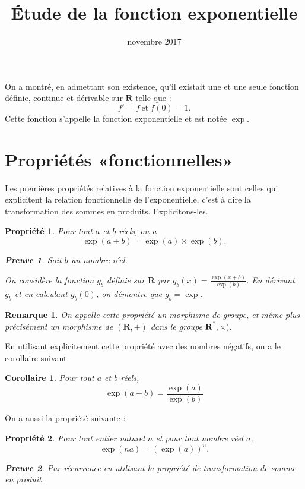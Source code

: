 \documentclass[12pt,a4paper,french]{article}
\title{Étude de la fonction exponentielle}
\author{\bsc{Jumel}}
\date{novembre 2017}
\makeatletter
\renewcommand{\maketitle}%
{\framebox{%
    \begin{minipage}{1.0\linewidth}%
      \begin{center}%
        \Large \@title ~-- \@author \\%
        \@date%
      \end{center}%
    \end{minipage}}%
  \normalsize%
}
\newcommand{\R}{\mathbf{R}}
\theoremstyle{break}
\newtheorem{propriete}{Propriété}
\newtheorem{corollaire}{Corollaire}
\theoremstyle{plain}
\theoremstyle{nonumberplain}
\newtheorem{remarque}{Remarque}
\newtheorem{preuve}{Preuve}
\theoremstyle{nonumberbreak}
\makeatother
\begin{document}
\maketitle

On a montré, en admettant son existence, qu'il existait une et une seule
fonction définie, continue et dérivable sur $\R$ telle que : \[ f' = f \
\text{et}\ f(0) = 1.\] Cette fonction s'appelle la fonction
exponentielle et est notée $\exp$.

\section{Propriétés «fonctionnelles»}

Les premières propriétés relatives à la fonction exponentielle sont
celles qui explicitent la relation fonctionnelle de l'exponentielle,
c'est à dire la transformation des sommes en produits. Explicitons-les.


\begin{propriete}
  Pour tout $a$ et $b$ réels, on a \[\exp(a+ b) = \exp(a)\times\exp(b)
  .\]
  \begin{preuve}
    Soit $b$ un nombre réel.

    On considère la fonction $g_b$ définie sur $\R$ par $g_b(x) =
    \frac{\exp(x+b)}{\exp(b)}$. En dérivant $g_b$ et en calculant
    $g_b(0)$, on démontre que $g_b = \exp$.
  \end{preuve}
\end{propriete}

\begin{remarque}
  On appelle cette propriété un morphisme de groupe, et même plus
  précisément un morphisme de $(\R,+)$ dans le groupe $\R^*,\times)$.
\end{remarque}

En utilisant explicitement cette propriété avec des nombres négatifs, on
a le corollaire suivant.

\begin{corollaire}
  Pour tout $a$ et $b$ réels, \[ \exp(a-b) = \frac{\exp(a)}{\exp(b)} \]
\end{corollaire}

On a aussi la propriété suivante :
\begin{propriete}
  Pour tout entier naturel $n$ et pour tout nombre réel $a$, \[\exp(na)
  = (\exp(a))^n.\]
  \begin{preuve}
    Par récurrence en utilisant la propriété de transformation de somme
    en produit.
  \end{preuve}
\end{propriete}
\end{document}
